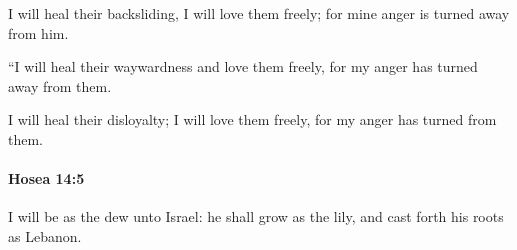 			\begin{versebox}
					\item[BHS] 
					\item[LXX] 
					\item[ASV] I will heal their backsliding, I will love them freely; for mine anger is turned away from him.
					\item[NIV] “I will heal their waywardness and love them freely, for my anger has turned away from them.
					\item[NRSV] I will heal their disloyalty; I will love them freely, for my anger has turned from them.
			\end{versebox}

		\paragraph{Hosea 14:5} %
			\label{HOSEA-14-5}

			I will be as the dew unto Israel: he shall grow as the lily, and cast forth his roots as Lebanon.

